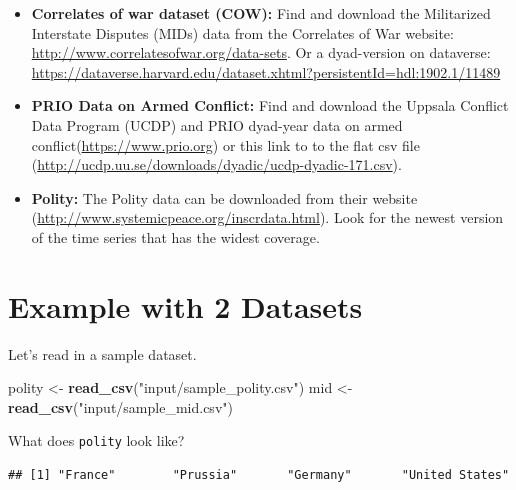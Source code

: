 \documentclass[]{book}
\newenvironment{Shaded}{\begin{snugshade}}{\end{snugshade}}
\newcommand{\KeywordTok}[1]{\textcolor[rgb]{0.13,0.29,0.53}{\textbf{#1}}}
\newcommand{\NormalTok}[1]{#1}
\newcommand{\OperatorTok}[1]{\textcolor[rgb]{0.81,0.36,0.00}{\textbf{#1}}}
\newcommand{\StringTok}[1]{\textcolor[rgb]{0.31,0.60,0.02}{#1}}
\providecommand{\tightlist}{%
  \setlength{\itemsep}{0pt}\setlength{\parskip}{0pt}}
\theoremstyle{definition}
\theoremstyle{definition}
\theoremstyle{definition}
\theoremstyle{remark}
\begin{document}
\begin{itemize}
\tightlist
\item
  \textbf{Correlates of war dataset (COW):} Find and download the Militarized Interstate Disputes (MIDs) data from the Correlates of War website: \url{http://www.correlatesofwar.org/data-sets}. Or a dyad-version on dataverse: \url{https://dataverse.harvard.edu/dataset.xhtml?persistentId=hdl:1902.1/11489}
\item
  \textbf{PRIO Data on Armed Conflict:} Find and download the Uppsala Conflict Data Program (UCDP) and PRIO dyad-year data on armed conflict(\url{https://www.prio.org}) or this link to to the flat csv file (\url{http://ucdp.uu.se/downloads/dyadic/ucdp-dyadic-171.csv}).
\item
  \textbf{Polity:} The Polity data can be downloaded from their website (\url{http://www.systemicpeace.org/inscrdata.html}). Look for the newest version of the time series that has the widest coverage.
\end{itemize}

\hypertarget{example-with-2-datasets}{%
\section{Example with 2 Datasets}\label{example-with-2-datasets}}

Let's read in a sample dataset.

\begin{Shaded}
\begin{Highlighting}[]
\NormalTok{polity <-}\StringTok{ }\KeywordTok{read_csv}\NormalTok{(}\StringTok{"input/sample_polity.csv"}\NormalTok{)}
\NormalTok{mid <-}\StringTok{ }\KeywordTok{read_csv}\NormalTok{(}\StringTok{"input/sample_mid.csv"}\NormalTok{)}
\end{Highlighting}
\end{Shaded}

What does \texttt{polity} look like?

\begin{Shaded}
\end{Shaded}

\begin{verbatim}
## [1] "France"        "Prussia"       "Germany"       "United States"
\end{verbatim}
\end{document}

